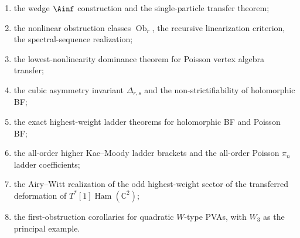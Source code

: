 \begin{enumerate}[leftmargin=2.2em]
\item the wedge $\Ainf$ construction and the single-particle transfer theorem;
\item the nonlinear obstruction classes $\operatorname{Ob}_r$, the recursive linearization criterion, the spectral-sequence realization;
\item the lowest-nonlinearity dominance theorem for Poisson vertex algebra transfer;
\item the cubic asymmetry invariant $\Delta_{r,s}$ and the non-strictifiability of holomorphic BF;
\item the exact highest-weight ladder theorems for holomorphic BF and Poisson BF;
\item the all-order higher Kac--Moody ladder brackets and the all-order Poisson $\pi_n$ ladder coefficients;
\item the Airy--Witt realization of the odd highest-weight sector of the transferred deformation of $T^*[1]\operatorname{Ham}(\mathbb{C}^2)$;
\item the first-obstruction corollaries for quadratic $W$-type PVAs, with $W_3$ as the principal example.
\end{enumerate}
